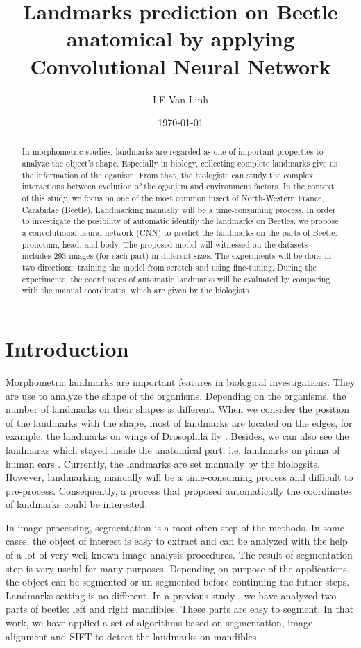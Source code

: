 \documentclass[12pt,a4paper]{article}
\begin{document}
\title{Landmarks prediction on Beetle anatomical by applying Convolutional Neural Network }
\author{LE Van Linh}
\date{\today}
\maketitle
\begin{abstract}
	In morphometric studies, landmarks are regarded as one of important properties to analyze the object's shape. Especially in biology, collecting complete landmarks give us the information of the oganism. From that, the biologists can study the complex interactions between evolution of the oganism and environment factors. In the context of this study, we focus on one of the most common insect of North-Western France, Carabidae (Beetle). Landmarking manually will be a time-consuming process. In order to investigate the posibility of automatic identify the landmarks on Beetles, we propose a convolutional neural network (CNN) to predict the landmarks on the parts of Beetle: pronotum, head, and body. The proposed model will witnessed on the datasets includes $293$ images (for each part) in different sizes. The experiments will be done in two directions: training the model from scratch and using fine-tuning. During the experiments, the coordinates of automatic landmarks will be evaluated by comparing with the manual coordinates, which are given by the biologists.
\end{abstract}
\section{Introduction}
Morphometric landmarks are important features in biological investigations. They are use to analyze the shape of the organisms. Depending on the organisms, the number of landmarks on their shapes is different. When we consider the position of the landmarks with the shape, most of landmarks are located on the edges, for example, the landmarks on wings of Drosophila fly \cite{.}. Besides, we can also see the landmarks which stayed inside the anatomical part, i.e, landmarks on pinna of human ears \cite{.}. Currently, the landmarks are set manually by the biologsits. However, landmarking manually will be a time-consuming process and difficult to pre-process. Consequently, a process that proposed automatically the coordinates of landmarks could be interested.

In image processing, segmentation is a most often step of the methods. In some cases, the object of interest is easy to extract and can be analyzed with the help of a lot of very well-known image analysis procedures. The result of segmentation step is very useful for many purposes. Depending on purpose of the applications, the object can be segmented or un-segmented before continuing the futher steps. Landmarks setting is no different. In a previous study \cite{.}, we have analyzed two parts of beetle: left and right mandibles. These parts are easy to segment. In that work, we have applied a set of algorithms based on segmentation, image alignment and SIFT \cite{.} to detect the landmarks on mandibles. 
\end{document}

